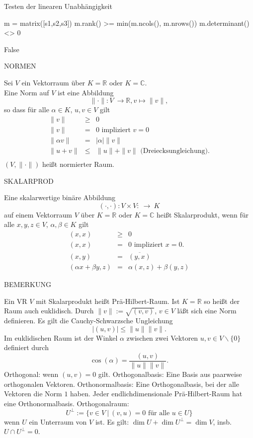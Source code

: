 \documentclass[fontsize=12pt,paper=a4,twoside,bibtotoc,idxtotoc,
liststotoc,pagesize,BCOR1.2cm,DIV15,chapterprefix,pagesize=pdftex]{scrbook}
\theoremstyle{plain}
\theoremstyle{definition}
\theoremstyle{remark}
\begin{document}
 Testen der linearen Unabhängigkeit
\begin{sagein}
m = matrix([s1,s2,s3])
m.rank() >= min(m.ncols(), m.nrows())
m.determinant() <> 0 
\end{sagein}

\begin{sage}
  False
\end{sage}


NORMEN

Sei $V$ ein Vektorraum über $K=\mathbb{R}$ oder $K=\mathbb{C}$.\\
Eine {\color{red} Norm} auf $V$ ist eine Abbildung
\[ \| \cdot \|: V \ \rightarrow \mathbb{R}, v \mapsto \| v \|, \]
so dass für  alle $\alpha \in K$, $u,v \in V$ gilt 
\[ \begin{array} {rcl}
\| v \| & \geq & 0 \\
\| v \| & = & 0 \mbox{ impliziert } v=0\\
\| \alpha v \| & = & | \alpha | \| v \|\\
\| u + v \| & \leq & \| u \| + \| v \| \mbox{ (Dreiecksungleichung)}.\\
\end{array} \]
$(V,\| \cdot \|)$
heißt {\color{red} normierter Raum}.

SKALARPROD

Eine skalarwertige binäre Abbildung
\[ ( \cdot, \cdot ): V \times V: \ \rightarrow \ K\]
auf einem Vektorraum $V$ über $K=\mathbb{R}$ oder $K=\mathbb{C}$ heißt
{\color{red} Skalarprodukt}, wenn für alle $x,y,z \in V$, $\alpha, \beta \in
K$ gilt 
\begin{eqnarray*}
(x,x) & \geq & 0\\
(x,x) & = & 0 \mbox{ impliziert } x=0.\\
(x,y) & = & \overline{(y,x)}\\
(\alpha x+\beta y,z) & = & \alpha (x,z)+ \beta (y,z)
\end{eqnarray*}

BEMERKUNG


 Ein VR $V$ mit Skalarprodukt heißt {\color{red} Prä-Hilbert-Raum}. Ist
$K=\mathbb{R}$ so heißt der Raum auch {\color{red} euklidisch}.
 Durch $\|v\|:=\sqrt{(v,v)}$, $v \in V$ läßt sich eine Norm
definieren. Es gilt die {\color{red} Cauchy-Schwarzsche Ungleichung}
\[ |(u,v)| \leq \| u \| \|v\|. \]
 Im euklidischen Raum ist der Winkel $\alpha$ zwischen zwei Vektoren
$u,v \in V\smallsetminus \{ 0 \}$ definiert durch
\[ \cos(\alpha) = \frac{(u,v)}{\|u\| \|v \|}. \]
 {\color{red} Orthogonal}: wenn $(u,v)=0$ gilt.
 {\color{red} Orthogonalbasis}: Eine Basis aus paarweise orthogonalen Vektoren. 
 {\color{red} Orthonormalbasis}: Eine Orthogonalbasis, bei der alle Vektoren die Norm $1$
haben.
 Jeder endlichdimensionale Prä-Hilbert-Raum hat eine
Orthonormalbasis. 
 {\color{red} Orthogonalraum}:
\[
{U}^\perp := \{ v \in V \ | \ (v,u)=0 \mbox{ für alle } u \in U \}
\]
wenn $U$ ein Unterraum von $V$ ist.
 Es gilt: $\dim U + \dim U^\perp = \dim V$, insb. $U \cap U^\perp = 0$.
\end{document}

